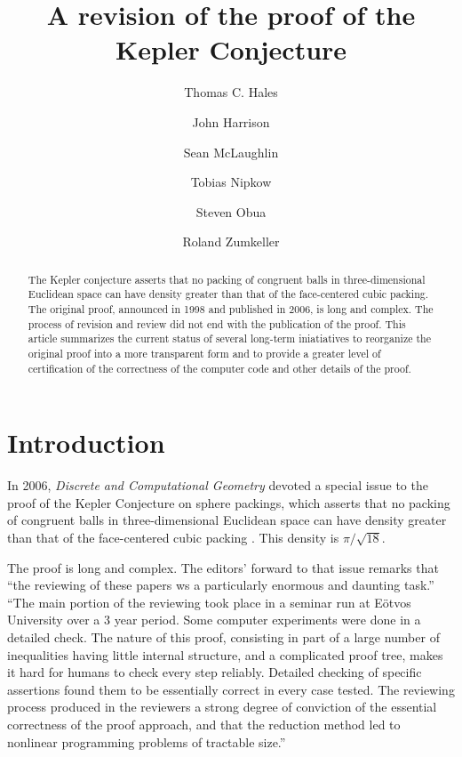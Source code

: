 \documentclass[11pt]{amsart}
\begin{document}
\title{A revision of the proof of the Kepler Conjecture}

\author[Hales]{Thomas C. Hales}
\address[T.~Hales]{Math Department, University of Pittsburgh}

\author[Harrison]{John Harrison}
\address[J.~Harrison]{Intel JF1-13, Hillsboro OR}

\author[McLaughlin]{Sean McLaughlin}
\address[S.~McLaughlin]{CMU}

\author[Nipkow]{Tobias Nipkow}
\address[T.~Nipkow]{TUM}

\author[Obua]{Steven Obua}
\address[S.~Obua]{TUM}

\author[Zumkeller]{Roland Zumkeller}
\address[R.~Zumkeller]{Palaiseau}

\begin{abstract}
The Kepler conjecture asserts that no packing of congruent balls in three-dimensional Euclidean space can
have density greater than that of the face-centered cubic packing.  The original proof,
announced in 1998 and published in 2006, is long and complex. The process of  revision and review did not end with the publication of the proof.
This article summarizes the current status of several long-term iniatiatives to
reorganize the original proof into a more transparent form and to provide a greater
level of certification of the correctness of the computer code and other details of the proof.
\end{abstract}


\maketitle

\section{Introduction}

In 2006, {\it Discrete and Computational Geometry} devoted a special issue to the
proof of the Kepler Conjecture on sphere packings, which asserts that no
packing of congruent balls in three-dimensional Euclidean space can
have density greater than that of the face-centered cubic packing \cite{Hales:2006:DCG}.
This density is $\pi/\sqrt{18}$.

The proof is long and complex.  The editors' forward to that issue remarks
that ``the reviewing of these papers ws a particularly enormous and daunting task.''
``The main portion of the reviewing took place in a seminar run at E\"otvos University
over a 3 year period.  Some computer experiments were done in a detailed check.
The nature of this proof, consisting in part of a large number of inequalities having
little internal structure, and a complicated proof tree, makes it hard for humans
to check every step reliably.  Detailed checking of specific assertions found them to
be essentially correct in every case tested.  The reviewing process produced in the
reviewers a strong degree of conviction of the essential correctness of the proof
approach, and that the reduction method led to nonlinear programming problems of
tractable size.''
\end{document}
